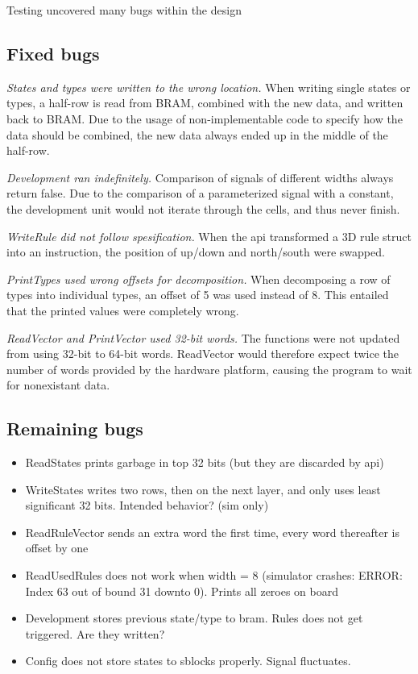 


Testing uncovered many bugs within the design

\subsection{Fixed bugs}

\emph{States and types were written to the wrong location.}
When writing single states or types, a half-row is read from BRAM, combined with the new data, and written back to BRAM.
Due to the usage of non-implementable code to specify how the data should be combined, the new data always ended up in the middle of the half-row.

\emph{Development ran indefinitely.}
Comparison of signals of different widths always return false.
Due to the comparison of a parameterized signal with a constant, the development unit would not iterate through the cells, and thus never finish.

\emph{WriteRule did not follow spesification.}
When the api transformed a 3D rule struct into an instruction, the position of up/down and north/south were swapped.

\emph{PrintTypes used wrong offsets for decomposition.}
When decomposing a row of types into individual types, an offset of 5 was used instead of 8.
This entailed that the printed values were completely wrong.

\emph{ReadVector and PrintVector used 32-bit words.}
The functions were not updated from using 32-bit to 64-bit words.
ReadVector would therefore expect twice the number of words provided by the hardware platform, causing the program to wait for nonexistant data.

\subsection{Remaining bugs}

\begin{itemize}
    \item ReadStates prints garbage in top 32 bits (but they are discarded by api)
    \item WriteStates writes two rows, then on the next layer, and only uses least significant 32 bits. Intended behavior? (sim only)
    \item ReadRuleVector sends an extra word the first time, every word thereafter is offset by one
    \item ReadUsedRules does not work when width = 8 (simulator crashes: ERROR: Index 63 out of bound 31 downto 0). Prints all zeroes on board
    \item Development stores previous state/type to bram. Rules does not get triggered. Are they written?
    \item Config does not store states to sblocks properly. Signal fluctuates.
\end{itemize}

